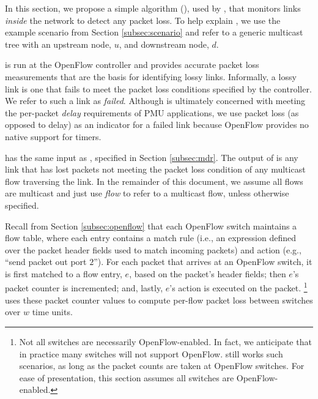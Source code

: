 

In this section, we propose a simple algorithm (\fls), used by \mdrs, that monitors links \emph{inside} the network to detect any packet loss.  To help explain \fls,
we use the example scenario from Section \ref{subsec:scenario} and refer to a generic multicast tree with an upstream node, $u$, and downstream node, $d$.

\fl is run at the OpenFlow controller and provides accurate packet loss measurements that are the basis for identifying lossy links.
Informally, a lossy link is one that fails to meet the packet loss conditions specified by the controller.  We refer to such a link as \emph{failed}.
Although \mdr is ultimately concerned with meeting the per-packet \emph{delay} requirements of PMU applications, 
we use  packet loss (as opposed to delay) as an indicator for a failed link because OpenFlow provides no native support for timers.

\fl has the same input as \mdrs, specified in Section \ref{subsec:mdr}.
The output of \fl is any link that has lost packets not meeting the packet loss condition of any multicast flow traversing the link. 
In the remainder of this document, we assume all flows are multicast and just use \emph{flow} to refer to a multicast flow, unless otherwise specified.

Recall from Section \ref{subsec:openflow} that each OpenFlow switch maintains a flow table, where each entry contains a match rule 
(i.e., an expression defined over the packet header fields used to match incoming packets) and action 
(e.g., ``send packet out port $2$''). For each packet that arrives at an OpenFlow switch, it is first matched to a flow entry, $e$, based on the packet's header fields; 
then $e$'s packet counter is incremented; and, lastly, $e$'s action is executed on the packet. 
\footnote{Not all switches are necessarily OpenFlow-enabled. In fact, we anticipate that in practice many switches will not support OpenFlow. \fl still works such scenarios, as long as 
the packet counts are taken at OpenFlow switches. For ease of presentation, this section assumes all switches are OpenFlow-enabled.}
\fl uses these packet counter values to compute per-flow packet loss between switches over $w$ time units. 

